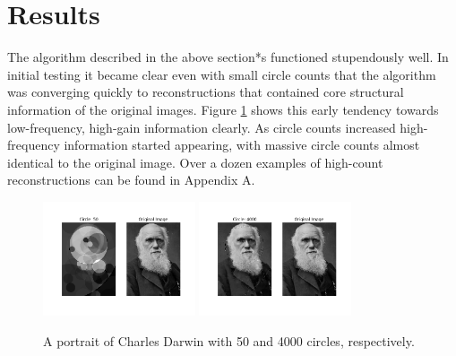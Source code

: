 \documentclass[12pt]{article}
\begin{document}
\section*{Results}
The algorithm described in the above section*s functioned stupendously well. In initial testing it became clear even with small circle counts that the algorithm was converging quickly to reconstructions that contained core structural information of the original images. Figure \ref{fig:darwin_0050} shows this early tendency towards low-frequency, high-gain information clearly. As circle counts increased high-frequency information started appearing, with massive circle counts almost identical to the original image. Over a dozen examples of high-count reconstructions can be found in Appendix A. 
\begin{figure}[H]
\centering
\noindent\includegraphics[width=0.4\textwidth]{../results/darwin/darwin_0050}
\noindent\includegraphics[width=0.4\textwidth]{../results/darwin/darwin_4000}
\caption{A portrait of Charles Darwin with 50 and 4000 circles, respectively. }
\label{fig:darwin_0050}
\end{figure}
\end{document}
